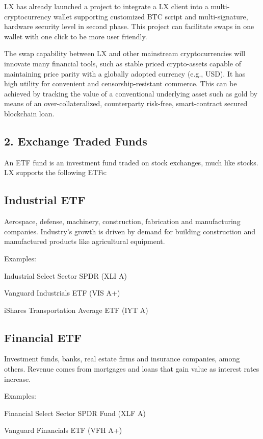 \documentclass[11pt]{article}
\begin{document}
LX has already launched a project to integrate a LX client into a multi-cryptocurrency wallet supporting customized BTC script and multi-signature, hardware security level in second phase. This project can facilitate swaps in one wallet with one click to be more user friendly.


The swap capability between LX and other mainstream cryptocurrencies will innovate many financial tools, such as stable priced crypto-assets capable of maintaining price parity with a globally adopted currency (e.g., USD). It has high utility for convenient and censorship-resistant commerce. This can be achieved by tracking the value of a conventional underlying asset such as gold by means of an over-collateralized, counterparty risk-free, smart-contract secured blockchain loan.


\subsection{2. Exchange Traded Funds}

An ETF fund is an investment fund traded on stock exchanges, much like stocks. LX supports the following ETFs:


\subsection{Industrial ETF}

Aerospace, defense, machinery, construction, fabrication and manufacturing companies. Industry's growth is driven by demand for building construction and manufactured products like agricultural equipment.


Examples:


Industrial Select Sector SPDR (XLI A)


Vanguard Industrials ETF (VIS A+)


iShares Transportation Average ETF (IYT A)


\subsection{Financial ETF}

Investment funds, banks, real estate firms and insurance companies, among others. Revenue comes from mortgages and loans that gain value as interest rates increase.


Examples:


Financial Select Sector SPDR Fund (XLF A)


Vanguard Financials ETF (VFH A+)
\end{document}
